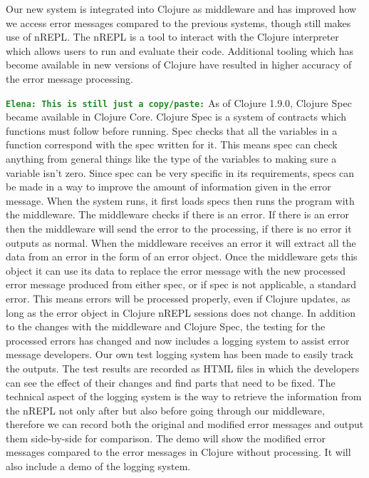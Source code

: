\documentclass[12pt]{article}
\newcommand{\comment}[1]{{\bf \tt  {#1}}}
\newcommand{\emcomment}[1]{\textcolor{ForestGreen}{\comment{Elena: {#1}}}}
\begin{document}
Our new system is integrated into Clojure as middleware and has improved how we access error messages compared to the previous systems, though still makes use of nREPL. The nREPL is a tool to interact with the Clojure interpreter which allows users to run and evaluate their code. Additional tooling which has become available in new versions of Clojure have resulted in higher accuracy of the error message processing. 

\emcomment{This is still just a copy/paste:}
As of Clojure 1.9.0, Clojure Spec became available in Clojure Core. Clojure Spec is a system of contracts which functions must follow before running. Spec checks that all the variables in a function correspond with the spec written for it. This means spec can check anything from general things like the type of the variables to making sure a variable isn’t zero. Since spec can be very specific in its requirements, specs can be made in a way to improve the amount of information given in the error message. 
When the system runs, it first loads specs then runs the program with the middleware. The middleware checks if there is an error. If there is an error then the middleware will send the error to the processing, if there is no error it outputs as normal. When the middleware receives an error it will extract all the data from an error in the form of an error object. Once the middleware gets this object it can use its data to replace the error message with the new processed error message produced from either spec, or if spec is not applicable, a standard error. This means errors will be processed properly, even if Clojure updates, as long as the error object in Clojure nREPL sessions does not change.  
In addition to the changes with the middleware and Clojure Spec, the testing for the processed errors has changed and now includes a logging system to assist error message developers. Our own test logging system has been made to easily track the outputs. The test results are recorded as HTML files in which the developers can see the effect of their changes and find parts that need to be fixed. The technical aspect of the logging system is the way to retrieve the information from the nREPL not only after but also before going through our middleware, therefore we can record both the original and modified error messages and output them side-by-side for comparison.
The demo will show the modified error messages compared to the error messages in Clojure without processing. It will also include a demo of the logging system.
\end{document}
